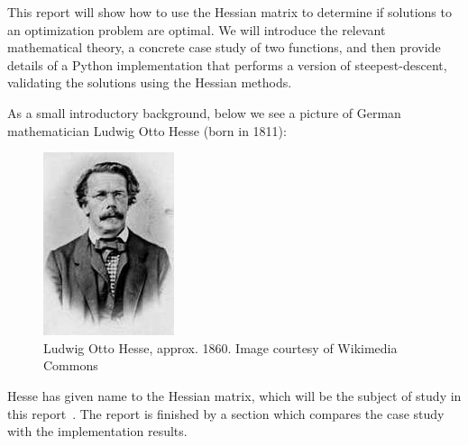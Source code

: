 \documentclass[../convex_optimization.tex]{subfiles}
\begin{document}
This report will show how to use the Hessian matrix to determine if solutions
to an optimization problem are optimal. 
We will introduce the relevant mathematical theory, a concrete case study of
two functions, and then provide details of a Python implementation that performs
a version of steepest-descent, validating the solutions using the Hessian methods.

As a small introductory background, below we see a picture of German
mathematician Ludwig Otto Hesse (born in 1811):
\begin{figure}[H]
    \begin{center}
        \includegraphics[width=0.5\linewidth]{figures/ludwig_otto_hesse.jpg}
        \caption{Ludwig Otto Hesse, approx. 1860. Image courtesy of Wikimedia Commons}
        \label{fig:hesse_picture}
    \end{center}
\end{figure}
Hesse has given name to the Hessian matrix, which will be the subject of study
in this report~\cite{hessian_wiki}.
The report is finished by a section which compares the
case study with the implementation results.
\end{document}
